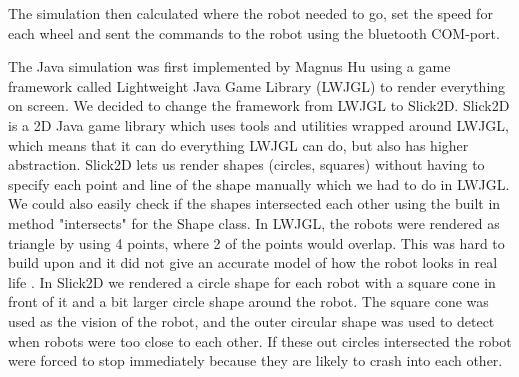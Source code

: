 The simulation then calculated where the robot needed to go, set the speed for each wheel and sent the commands to the robot using the bluetooth COM-port.

The Java simulation was first implemented by Magnus Hu using a game framework called Lightweight Java Game Library (LWJGL) to render everything on screen. We decided to change the framework from LWJGL to Slick2D. Slick2D is a 2D Java game library which uses tools and utilities wrapped around LWJGL, which means that it can do everything LWJGL can do, but also has higher abstraction. Slick2D lets us render shapes (circles, squares) without having to specify each point and line of the shape manually which we had to do in LWJGL. We could also easily check if the shapes intersected each other using the built in method "intersects" for the Shape class. In LWJGL, the robots were rendered as triangle by using 4 points, where 2 of the points would overlap. This was hard to build upon and it did not give an accurate model of how the robot looks in real life .
In Slick2D we rendered a circle shape for each robot with a square cone in front of it and a bit larger circle shape around the robot. The square cone was used as the vision of the robot, and the outer circular shape was used to detect when robots were too close to each other. If these out circles intersected the robot were forced to stop immediately because they are likely to crash into each other.\\



